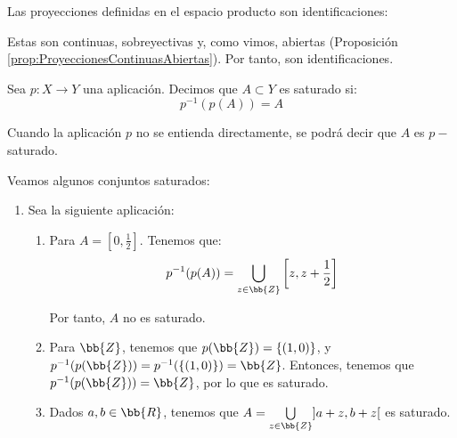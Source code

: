 \begin{ejemplo} Las proyecciones definidas en el espacio producto son identificaciones:

        Estas son continuas, sobreyectivas y, como vimos, abiertas (Proposición \ref{prop:ProyeccionesContinuasAbiertas}). Por tanto, son identificaciones.
\end{ejemplo}


\begin{definicion}
    Sea $p:X\to Y$ una aplicación. Decimos que $A\subset Y$ es saturado si:
    \begin{equation*}
        p^{-1}(p(A))=A
    \end{equation*}

    Cuando la aplicación $p$ no se entienda directamente, se podrá decir que $A$ es $p-$saturado.
\end{definicion}
\begin{ejemplo} Veamos algunos conjuntos saturados:
    \begin{enumerate}
        \item Sea la siguiente aplicación:

        \begin{enumerate}
            \item Para $A=\left[0,\frac{1}{2}\right]$. Tenemos que:
            \begin{equation*}
                p^{-1}(p(A)) = \bigcup_{z\in \bb{Z}}\left[z,z+\frac{1}{2}\right]
            \end{equation*}
    
            Por tanto, $A$ no es saturado.
    
            \item Para $\bb{Z}$, tenemos que $p(\bb{Z})=\{(1,0)\}$, y $p^{-1}(p(\bb{Z}))=p^{-1}(\{(1,0)\})=\bb{Z}$. Entonces, tenemos que $p^{-1}(p(\bb{Z}))=\bb{Z}$, por lo que es saturado.

            \item Dados $a,b\in \bb{R}$, tenemos que $A=\bigcup\limits_{z\in \bb{Z}}]a+z, b+z[$ es saturado.
        \end{enumerate}
    \end{enumerate}
\end{ejemplo}


